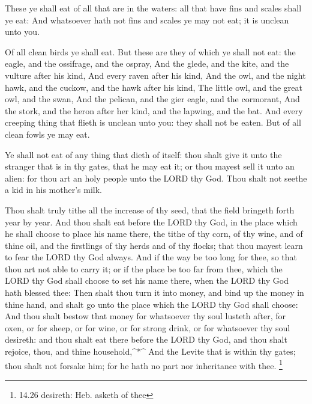  These ye shall eat of all that are in the waters: all that
have fins and scales shall ye eat:  And whatsoever hath not
fins and scales ye may not eat; it is unclean unto you.

 Of all clean birds ye shall eat.  But these
are they of which ye shall not eat: the eagle, and the ossifrage, and
the ospray,  And the glede, and the kite, and the vulture
after his kind,  And every raven after his kind,
 And the owl, and the night hawk, and the cuckow, and the
hawk after his kind,  The little owl, and the great owl,
and the swan,  And the pelican, and the gier eagle, and the
cormorant,  And the stork, and the heron after her kind,
and the lapwing, and the bat.  And every creeping thing
that flieth is unclean unto you: they shall not be eaten. 
But of all clean fowls ye may eat.

 Ye shall not eat of any thing that dieth of itself: thou
shalt give it unto the stranger that is in thy gates, that he may eat
it; or thou mayest sell it unto an alien: for thou art an holy people
unto the LORD thy God. Thou shalt not seethe a kid in his mother's milk.

 Thou shalt truly tithe all the increase of thy seed, that
the field bringeth forth year by year.  And thou shalt eat
before the LORD thy God, in the place which he shall choose to place his
name there, the tithe of thy corn, of thy wine, and of thine oil, and
the firstlings of thy herds and of thy flocks; that thou mayest learn to
fear the LORD thy God always.  And if the way be too long
for thee, so that thou art not able to carry it; or if the place be too
far from thee, which the LORD thy God shall choose to set his name
there, when the LORD thy God hath blessed thee:  Then shalt
thou turn it into money, and bind up the money in thine hand, and shalt
go unto the place which the LORD thy God shall choose:  And
thou shalt bestow that money for whatsoever thy soul lusteth after, for
oxen, or for sheep, or for wine, or for strong drink, or for whatsoever
thy soul desireth: and thou shalt eat there before the LORD thy God, and
thou shalt rejoice, thou, and thine household,\^{}*\^{} 
And the Levite that is within thy gates; thou shalt not forsake him; for
he hath no part nor inheritance with thee. \footnote{14.26 desireth:
  Heb. asketh of thee}

